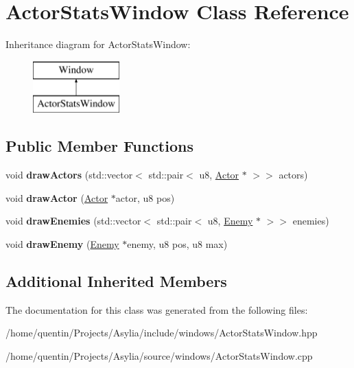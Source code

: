 \hypertarget{classActorStatsWindow}{\section{Actor\-Stats\-Window Class Reference}
\label{classActorStatsWindow}
}
Inheritance diagram for Actor\-Stats\-Window\-:\begin{figure}[H]
\begin{center}
\leavevmode
\includegraphics[height=2.000000cm]{classActorStatsWindow}
\end{center}
\end{figure}
\subsection*{Public Member Functions}
\begin{DoxyCompactItemize}
\item 
\hypertarget{classActorStatsWindow_a6d3183b98676321266e9dcf521539da8}{void {\bfseries draw\-Actors} (std\-::vector$<$ std\-::pair$<$ u8, \hyperlink{classActor}{Actor} $\ast$ $>$$>$ actors)}\label{classActorStatsWindow_a6d3183b98676321266e9dcf521539da8}

\item 
\hypertarget{classActorStatsWindow_a23bbdc3900d258e383dbc587ee54c9b3}{void {\bfseries draw\-Actor} (\hyperlink{classActor}{Actor} $\ast$actor, u8 pos)}\label{classActorStatsWindow_a23bbdc3900d258e383dbc587ee54c9b3}

\item 
\hypertarget{classActorStatsWindow_a3d4107851aca473952c649174debe167}{void {\bfseries draw\-Enemies} (std\-::vector$<$ std\-::pair$<$ u8, \hyperlink{classEnemy}{Enemy} $\ast$ $>$$>$ enemies)}\label{classActorStatsWindow_a3d4107851aca473952c649174debe167}

\item 
\hypertarget{classActorStatsWindow_aa1b7fbbc383eacf191fe3dbca2407f3d}{void {\bfseries draw\-Enemy} (\hyperlink{classEnemy}{Enemy} $\ast$enemy, u8 pos, u8 max)}\label{classActorStatsWindow_aa1b7fbbc383eacf191fe3dbca2407f3d}

\end{DoxyCompactItemize}
\subsection*{Additional Inherited Members}


The documentation for this class was generated from the following files\-:\begin{DoxyCompactItemize}
\item 
/home/quentin/\-Projects/\-Asylia/include/windows/Actor\-Stats\-Window.\-hpp\item 
/home/quentin/\-Projects/\-Asylia/source/windows/Actor\-Stats\-Window.\-cpp\end{DoxyCompactItemize}
